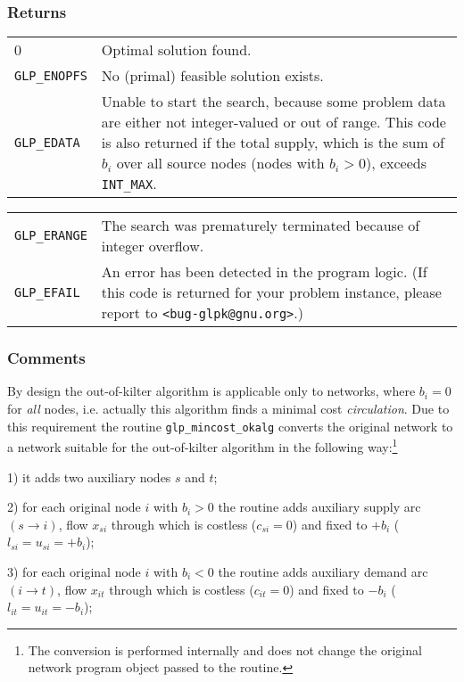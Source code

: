 \subsubsection*{Returns}

\def\arraystretch{1}

\begin{tabular}{@{}p{25mm}p{97.3mm}@{}}
0 & Optimal solution found.\\
\verb|GLP_ENOPFS| & No (primal) feasible solution exists.\\
\verb|GLP_EDATA| & Unable to start the search, because some problem
data are either not integer-valued or out of range. This code is also
returned if the total supply, which is the sum of $b_i$ over all source
nodes (nodes with $b_i>0$), exceeds \verb|INT_MAX|.\\
\end{tabular}

\noindent
\begin{tabular}{@{}p{25mm}p{97.3mm}@{}}
\verb|GLP_ERANGE| & The search was prematurely terminated because of
integer overflow.\\
\verb|GLP_EFAIL| & An error has been detected in the program logic.
(If this code is returned for your problem instance, please report to
\verb|<bug-glpk@gnu.org>|.)\\
\end{tabular}

\subsubsection*{Comments}

By design the out-of-kilter algorithm is applicable only to networks,
where $b_i=0$ for {\it all} nodes, i.e. actually this algorithm finds a
minimal cost {\it circulation}. Due to this requirement the routine
\verb|glp_mincost_okalg| converts the original network to a network
suitable for the out-of-kilter algorithm in the following
way:\footnote{The conversion is performed internally and does not change
the original network program object passed to the routine.}

1) it adds two auxiliary nodes $s$ and $t$;

2) for each original node $i$ with $b_i>0$ the routine adds auxiliary
supply arc $(s\rightarrow i)$, flow $x_{si}$ through which is costless
($c_{si}=0$) and fixed to $+b_i$ ($l_{si}=u_{si}=+b_i$);

3) for each original node $i$ with $b_i<0$ the routine adds auxiliary
demand arc $(i\rightarrow t)$, flow $x_{it}$ through which is costless
($c_{it}=0$) and fixed to $-b_i$ ($l_{it}=u_{it}=-b_i$);

